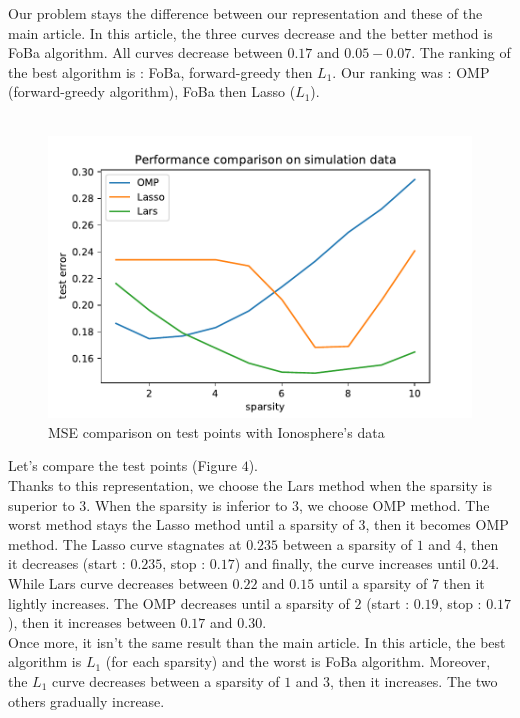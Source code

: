 \documentclass{article}
\begin{document}
Our problem stays the difference between our representation and these of the main article. In this article, the three curves decrease and the better method is FoBa algorithm. All curves decrease between $0.17$ and $0.05-0.07$. The ranking of the best algorithm is : FoBa, forward-greedy then $L_1$. Our ranking was : OMP (forward-greedy algorithm), FoBa then Lasso ($L_1$).\\
\\
\begin{figure}[!ht]
    \centering
    \includegraphics[scale=0.5]{./images/test_error_ionosphere.pdf}
    \caption{MSE comparison on test points with Ionosphere's data}
    \label{Figure 4}
\end{figure}
Let's compare the test points (Figure $4$).\\
Thanks to this representation, we choose the Lars method when the sparsity is superior to $3$. When the sparsity is inferior to $3$, we choose OMP method. The worst method stays the Lasso method until a sparsity of $3$, then it becomes OMP method. The Lasso curve stagnates at $0.235$ between a sparsity of $1$ and $4$, then it decreases (start : $0.235$, stop : $0.17$) and finally, the curve increases until $0.24$. While Lars curve decreases between $0.22$ and $0.15$ until a sparsity of $7$ then it lightly increases. The OMP decreases until a sparsity of $2$ (start : $0.19$, stop : $0.17$), then it increases between $0.17$ and $0.30$.\\
Once more, it isn't the same result than the main article. In this article, the best algorithm is $L_1$ (for each sparsity) and the worst is  FoBa algorithm. Moreover, the $L_1$ curve decreases between a sparsity of $1$ and $3$, then it increases. The two others gradually increase.\\ 
\end{document}
